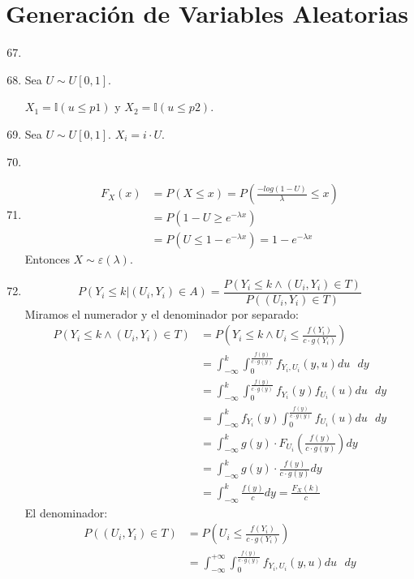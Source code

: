 \section{Generación de Variables Aleatorias}
\begin{enumerate}
	\setcounter{enumi}{66}
	\item
	\item
		Sea $U\sim U[0,1]$.
		
		$X_1 = \mathbb{I}(u\leq p1)$ y $X_2 = \mathbb{I}(u\leq p2)$.
	\item
		Sea $U\sim U[0,1]$. $X_i = i\cdot U$.
	\item
	\item
		\begin{align*}
			F_X(x)	& = P(X\leq x) = P\left(\frac{-log(1-U)}{\lambda} \leq x\right)	\\
					& = P\left(1-U \geq e^{-\lambda x}\right)	\\
					& = P(U \leq 1 - e^{-\lambda x}) = 1 - e^{-\lambda x}
		\end{align*}
		Entonces $X\sim \varepsilon(\lambda)$.
	\item
		$$P(Y_i \leq k | (U_i, Y_i) \in A) = \frac{P(Y_i \leq k \land (U_i, Y_i) \in T)}{P( (U_i, Y_i) \in T)}$$
		Miramos el numerador y el denominador por separado:
		\begin{align*}
			P(Y_i \leq k \land (U_i, Y_i) \in T)	& = P\left(Y_i \leq k \land U_i \leq \frac{f(Y_i)}{c\cdot g(Y_i)}\right)		\\
									& = \int_{-\infty}^{k}\int_{0}^{\frac{f(y)}{c\cdot g(y)}} f_{Y_i,U_i}(y,u) du\text{ }dy			\\
									& = \int_{-\infty}^{k}\int_{0}^{\frac{f(y)}{c\cdot g(y)}} f_{Y_i}(y)f_{U_i}(u) du\text{ }dy		\\
									& = \int_{-\infty}^{k} f_{Y_i}(y) \int_{0}^{\frac{f(y)}{c\cdot g(y)}} f_{U_i}(u) du\text{ }dy	\\
									& = \int_{-\infty}^{k} g(y)\cdot F_{U_i}\left(\frac{f(y)}{c\cdot g(y)}\right) dy				\\
									& = \int_{-\infty}^{k} g(y)\cdot \frac{f(y)}{c\cdot g(y)} dy									\\
									& = \int_{-\infty}^{k} \frac{f(y)}{c} dy = \frac{F_X(k)}{c}
		\end{align*}
		El denominador:
		\begin{align*}
			P((U_i, Y_i) \in T)	& = P\left(U_i \leq \frac{f(Y_i)}{c\cdot g(Y_i)}\right)	\\
								& = \int_{-\infty}^{+\infty}\int_{0}^{\frac{f(y)}{c\cdot g(y)}} f_{Y_i,U_i}(y,u) du\text{ }dy		\\

\end{align*}
\end{enumerate}
